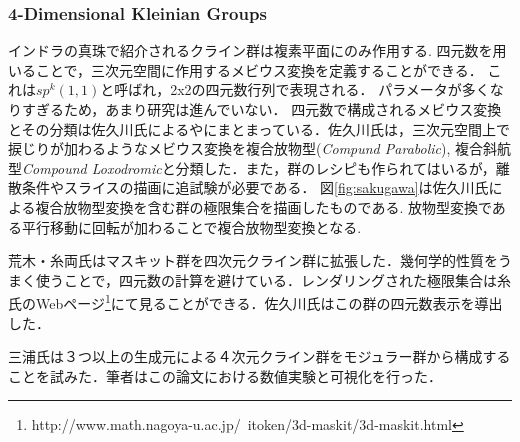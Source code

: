 \subsubsection{4-Dimensional Kleinian Groups}
インドラの真珠で紹介されるクライン群は複素平面にのみ作用する.
四元数を用いることで，三次元空間に作用するメビウス変換を定義することができる．
これは$sp^k(1, 1)$と呼ばれ，2x2の四元数行列で表現される．
パラメータが多くなりすぎるため，あまり研究は進んでいない．
四元数で構成されるメビウス変換とその分類は佐久川氏による\cite{sakugawaMaster}や\cite{accidentalParabolic}にまとまっている．佐久川氏は，三次元空間上で捩じりが加わるようなメビウス変換を複合放物型({\it Compund Parabolic}), 複合斜航型{\it Compound Loxodromic}と分類した．また，群のレシピも作られてはいるが，離散条件やスライスの描画に追試験が必要である．
図\ref{fig:sakugawa}は佐久川氏による複合放物型変換を含む群の極限集合を描画したものである. 放物型変換である平行移動に回転が加わることで複合放物型変換となる.

荒木・糸両氏はマスキット群を四次元クライン群に拡張した\cite{maskit}．幾何学的性質をうまく使うことで，四元数の計算を避けている．レンダリングされた極限集合は糸氏のWebページ\footnote{http://www.math.nagoya-u.ac.jp/~itoken/3d-maskit/3d-maskit.html}にて見ることができる．佐久川氏はこの群の四元数表示を導出した\cite{sakugawa4d}．

三浦氏は３つ以上の生成元による４次元クライン群をモジュラー群から構成することを試みた\cite{miura}．筆者はこの論文における数値実験と可視化を行った．

